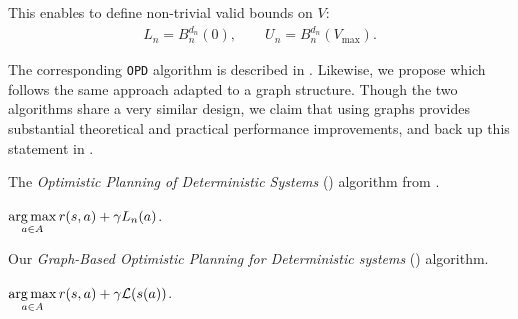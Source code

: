 \documentclass[runningheads]{llncs}
\begin{document}
This enables \citet{hren2008optimistic} to define non-trivial valid bounds on $V$:
\begin{align}
L_n = B_n^{d_n}(0), \qquad U_n = B_n^{d_n}(V_{\max}).
\end{align}

The corresponding \texttt{OPD} algorithm is described in . Likewise, we propose  which follows the same approach adapted to a graph structure. Though the two algorithms share a very similar design, we claim that using graphs provides substantial theoretical and practical performance improvements, and back up this statement in .

\begin{algorithm}[th]
	\caption{The \emph{Optimistic Planning of Deterministic Systems} (\OPD) algorithm from \citep{hren2008optimistic}.}
	\label{alg:opd}
	\DontPrintSemicolon
	\Return $\displaystyle\operatorname*{arg\,max}_{a\in A} r(s, a) + \gamma L_n(a)$. \;
\end{algorithm}

\begin{algorithm}[th]
	\caption{Our \emph{Graph-Based Optimistic Planning for Deterministic systems} (\GBOPD) algorithm.}
	\label{alg:gbopd}
	\DontPrintSemicolon
	\Return $\displaystyle\operatorname*{arg\,max}_{a\in A} r(s,a) + \gamma \mathcal{L}(s(a))$. 
\end{algorithm}
\end{document}
